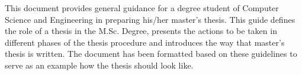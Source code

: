 This document provides general guidance for a degree student of Computer Science and Engineering in preparing his/her master's thesis. This guide defines the role of a thesis in the M.Sc. Degree, presents the actions to be taken in different phases of the thesis procedure and introduces the way that master’s thesis is written. The document has been formatted based on these guidelines to serve as an example how the thesis should look like.
